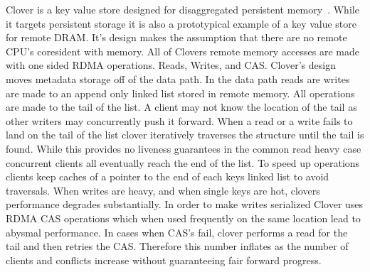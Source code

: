 Clover is a key value store designed for disaggregated persistent
memory~\cite{clover}. While it targets persistent storage it is also a
prototypical example of a key value store for remote DRAM. It's design makes the
assumption that there are no remote CPU's coresident with memory. All of Clovers
remote memory accesses are made with one sided RDMA operations. Reads, Writes,
and CAS. Clover's design moves metadata storage off of the data path. In the
data path reads are writes are made to an append only linked list stored in
remote memory. All operations are made to the tail of the list. A client may not
know the location of the tail as other writers may concurrently push it forward.
When a read or a write fails to land on the tail of the list clover iteratively
traverses the structure until the tail is found. While this provides no liveness
guarantees in the common read heavy case concurrent clients all eventually reach
the end of the list. To speed up operations clients keep caches of a pointer to
the end of each keys linked list to avoid traversals. When writes are heavy, and
when single keys are hot, clovers performance degrades substantially. In order
to make writes serialized Clover uses RDMA CAS operations which when used
frequently on the same location lead to abysmal performance. In cases when CAS's
fail, clover performs a read for the tail and then retries the CAS. Therefore
this number inflates as the number of clients and conflicts increase without
guaranteeing fair forward progress.